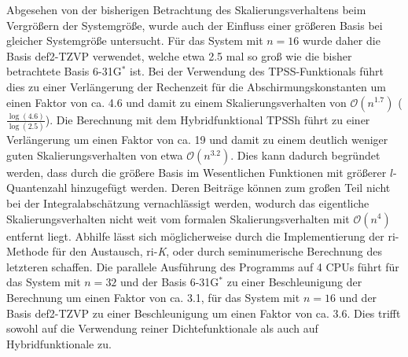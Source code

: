 \bigskip
Abgesehen von der bisherigen Betrachtung des Skalierungsverhaltens beim Vergrößern der Systemgröße, wurde auch der Einfluss einer größeren Basis bei gleicher Systemgröße untersucht. Für das System mit $n=16$ wurde daher die Basis def2-TZVP verwendet, welche etwa 2.5 mal so groß wie die bisher betrachtete Basis 6-31G$^*$ ist. Bei der Verwendung des TPSS-Funktionals führt dies zu einer Verlängerung der Rechenzeit für die Abschirmungskonstanten um einen Faktor von ca. 4.6 und damit zu einem Skalierungsverhalten von $\mathcal{O}(n^{1.7})$ ($\frac{\log(4.6)}{\log(2.5)}$). Die Berechnung mit dem Hybridfunktional TPSSh führt zu einer Verlängerung um einen Faktor von ca. 19 und damit zu einem deutlich weniger guten Skalierungsverhalten von etwa $\mathcal{O}(n^{3.2})$. Dies kann dadurch begründet werden, dass durch die größere Basis im Wesentlichen Funktionen mit größerer $l$-Quantenzahl hinzugefügt werden. Deren Beiträge können zum großen Teil nicht bei der Integralabschätzung vernachlässigt werden, wodurch das eigentliche Skalierungsverhalten nicht weit vom formalen Skalierungsverhalten mit $\mathcal{O}(n^{4})$ entfernt liegt. Abhilfe lässt sich möglicherweise durch die Implementierung der \ac{ri}-Methode für den Austausch, \ac{ri}-\textit{K}\supercite{weigend2002fully}, oder durch seminumerische Berechnung\supercite{neese2009efficient,plessow2012seminumerical} des letzteren schaffen. Die parallele Ausführung des Programms auf 4 CPUs führt für das System mit $n=32$ und der Basis 6-31G$^*$ zu einer Beschleunigung der Berechnung um einen Faktor von ca. 3.1, für das System mit $n=16$ und der Basis def2-TZVP zu einer Beschleunigung um einen Faktor von ca. 3.6. Dies trifft sowohl auf die Verwendung reiner Dichtefunktionale als auch auf Hybridfunktionale zu.
